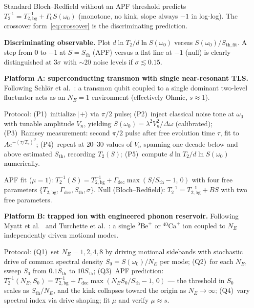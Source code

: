 \documentclass[11pt]{article}
\theoremstyle{remark}
\begin{document}
Standard Bloch--Redfield without an APF threshold predicts $T_2^{-1} = T_{2,\mathrm{bg}}^{-1} + \Gamma_0 S(\omega_0)$ (monotone, no kink, slope always $-1$ in log-log).  The crossover form~\eqref{eq:crossover} is the discriminating prediction.

\medskip\noindent\textbf{Discriminating observable.}  Plot $d\ln T_2/d\ln S(\omega_0)$ versus $S(\omega_0)/S_{\mathrm{th,fit}}$.  A step from $0$ to $-1$ at $S = S_{\mathrm{th}}$ (APF) versus a flat line at $-1$ (null) is clearly distinguished at $3\sigma$ with $\sim 20$ noise levels if $\sigma \lesssim 0.15$.

\medskip\noindent\textbf{Platform A: superconducting transmon with single near-resonant TLS.}  Following Schl\"or et al.~\cite{Schlor2019}: a transmon qubit coupled to a single dominant two-level fluctuator acts as an $N_E = 1$ environment (effectively Ohmic, $s \approx 1$).

Protocol: (P1)~initialize $|{+}\rangle$ via $\pi/2$ pulse; (P2)~inject classical noise tone at $\omega_0$ with tunable amplitude $V_n$, yielding $S(\omega_0) = \lambda^2 V_n^2/\Delta\omega$ (calibrated); (P3)~Ramsey measurement: second $\pi/2$ pulse after free evolution time $\tau$, fit to $A e^{-(\tau/T_2)^\beta}$; (P4)~repeat at 20--30 values of $V_n$ spanning one decade below and above estimated $S_{\mathrm{th}}$, recording $T_2(S)$; (P5)~compute $d\ln T_2/d\ln S(\omega_0)$ numerically.

APF fit ($\mu = 1$): $T_2^{-1}(S) = T_{2,\mathrm{bg}}^{-1} + \Gamma_{\mathrm{dec}} \max(S/S_{\mathrm{th}} - 1,\, 0)$ with four free parameters $\{T_{2,\mathrm{bg}}, \Gamma_{\mathrm{dec}}, S_{\mathrm{th}}, \sigma\}$.  Null (Bloch--Redfield): $T_2^{-1} = T_{2,\mathrm{bg}}^{-1} + BS$ with two free parameters.

\medskip\noindent\textbf{Platform B: trapped ion with engineered phonon reservoir.}  Following Myatt et al.~\cite{Myatt2000} and Turchette et al.~\cite{Turchette2000PRA}: a single $^9\mathrm{Be}^+$ or $^{40}\mathrm{Ca}^+$ ion coupled to $N_E$ independently driven motional modes.

Protocol: (Q1)~set $N_E = 1, 2, 4, 8$ by driving motional sidebands with stochastic drive of common spectral density $S_0 = S(\omega_0)/N_E$ per mode; (Q2)~for each $N_E$, sweep $S_0$ from $0.1 S_{\mathrm{th}}$ to $10 S_{\mathrm{th}}$; (Q3)~APF prediction: $T_2^{-1}(N_E, S_0) = T_{2,\mathrm{bg}}^{-1} + \Gamma_{\mathrm{dec}} \max(N_E S_0/S_{\mathrm{th}} - 1,\, 0)$ --- the threshold in $S_0$ scales as $S_{\mathrm{th}}/N_E$, and the kink collapses toward the origin as $N_E \to \infty$; (Q4)~vary spectral index via drive shaping; fit $\mu$ and verify $\mu \approx s$.
\end{document}
